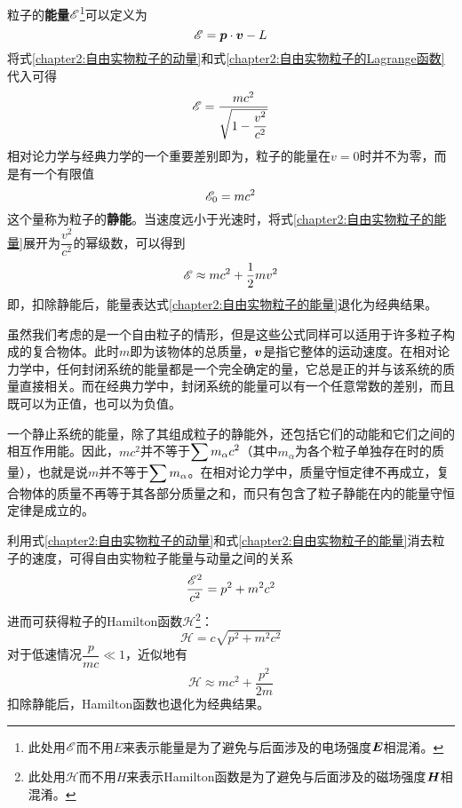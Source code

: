 粒子的{\bf 能量}$\mathscr{E}$\footnote{此处用$\mathscr{E}$而不用$E$来表示能量是为了避免与后面涉及的电场强度$\boldsymbol{E}$相混淆。}可以定义为
\begin{equation}
	\mathscr{E} = \boldsymbol{p}\cdot \boldsymbol{v} - L
	\label{chapter2:粒子能量的定义}
\end{equation}
将式\eqref{chapter2:自由实物粒子的动量}和式\eqref{chapter2:自由实物粒子的Lagrange函数}代入可得
\begin{equation}
	\mathscr{E} = \frac{mc^2}{\sqrt{1-\dfrac{v^2}{c^2}}}
	\label{chapter2:自由实物粒子的能量}
\end{equation}
相对论力学与经典力学的一个重要差别即为，粒子的能量在$v=0$时并不为零，而是有一个有限值
\begin{equation}
	\mathscr{E}_0 = mc^2
	\label{chapter2:粒子的静能}
\end{equation}
这个量称为粒子的{\bf 静能}。当速度远小于光速时，将式\eqref{chapter2:自由实物粒子的能量}展开为$\dfrac{v^2}{c^2}$的幂级数，可以得到
\begin{equation*}
	\mathscr{E} \approx mc^2 + \frac12mv^2
\end{equation*}
即，扣除静能后，能量表达式\eqref{chapter2:自由实物粒子的能量}退化为经典结果。

虽然我们考虑的是一个自由粒子的情形，但是这些公式同样可以适用于许多粒子构成的复合物体。此时$m$即为该物体的总质量，$\boldsymbol{v}$是指它整体的运动速度。在相对论力学中，任何封闭系统的能量都是一个完全确定的量，它总是正的并与该系统的质量直接相关。而在经典力学中，封闭系统的能量可以有一个任意常数的差别，而且既可以为正值，也可以为负值。

一个静止系统的能量，除了其组成粒子的静能外，还包括它们的动能和它们之间的相互作用能。因此，$mc^2$并不等于$\displaystyle \sum m_\alpha c^2$（其中$m_\alpha$为各个粒子单独存在时的质量），也就是说$m$并不等于$\displaystyle \sum m_\alpha$。在相对论力学中，质量守恒定律不再成立，复合物体的质量不再等于其各部分质量之和，而只有包含了粒子静能在内的能量守恒定律是成立的。

利用式\eqref{chapter2:自由实物粒子的动量}和式\eqref{chapter2:自由实物粒子的能量}消去粒子的速度，可得自由实物粒子能量与动量之间的关系
\begin{equation}
	\frac{\mathscr{E}^2}{c^2} = p^2+m^2c^2
	\label{chapter2:自由实物粒子能量与动量之间的关系}
\end{equation}
进而可获得粒子的Hamilton函数$\mathscr{H}$\footnote{此处用$\mathscr{H}$而不用$H$来表示Hamilton函数是为了避免与后面涉及的磁场强度$\boldsymbol{H}$相混淆。}：
\begin{equation}
	\mathscr{H} = c\sqrt{p^2+m^2c^2}
	\label{chapter2:自由实物粒子的Hamilton函数}
\end{equation}
对于低速情况$\dfrac{p}{mc}\ll 1$，近似地有
\begin{equation*}
	\mathscr{H} \approx mc^2 + \frac{p^2}{2m}
\end{equation*}
扣除静能后，Hamilton函数也退化为经典结果。


